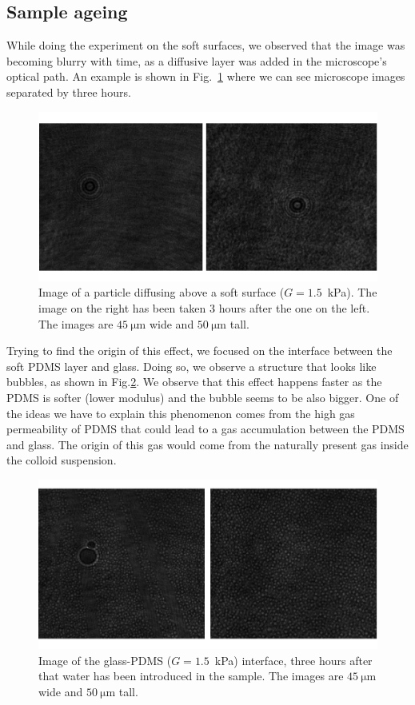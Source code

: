 \subsection{Sample ageing}

While doing the experiment on the soft surfaces, we observed that the image was becoming blurry with time, as a diffusive layer was added in the microscope's optical path. An example is shown in Fig.~\ref{fig.3hours1p5kpa} where we can see microscope images separated by three hours.


\begin{figure}[h]
	\centering
	\includegraphics{02_body/chapter4/images/ageing/diffusing_particle_1p5kpa_3hours.pdf}
	\caption{Image of a particle diffusing above a soft surface ($G=1.5$~kPa). The image on the right has been taken 3 hours after the one on the left. The images are $45~\mathrm{\mu m}$ wide and $50~\mathrm{\mu m}$ tall. }
	\label{fig.3hours1p5kpa}
\end{figure}

Trying to find the origin of this effect, we focused on the interface between the soft PDMS layer and glass. Doing so, we observe a structure that looks like bubbles, as shown in Fig.\ref{fig.bubbles}. We observe that this effect happens faster as the PDMS is softer (lower modulus) and the bubble seems to be also bigger. One of the ideas we have to explain this phenomenon comes from the high gas permeability of PDMS that could lead to a gas accumulation between the PDMS and glass. The origin of this gas would come from the naturally present gas inside the colloid suspension.


\begin{figure}[h]
	\centering
	\includegraphics{02_body/chapter4/images/ageing/bullbles_1p5kpa_3hours.pdf}
	\caption{Image of the glass-PDMS ($G=1.5$~kPa) interface, three hours after that water has been introduced in the sample. The images are $45~\mathrm{\mu m}$ wide and $50~\mathrm{\mu m}$ tall.}
	\label{fig.bubbles}
\end{figure}
